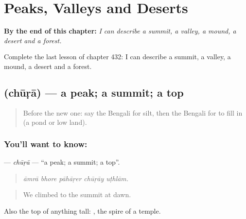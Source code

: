 
\chapter{Peaks, Valleys and Deserts}
\label{ch:bn-peaks-valleys-and-deserts}

\begin{chapteropening}
\textbf{By the end of this chapter:} \emph{I can describe a summit, a valley, a mound, a desert and a forest.}

Complete the last lesson of chapter 432: I can describe a summit, a valley, a mound, a desert and a forest.
\end{chapteropening}

\section[\texorpdfstring{\bn{চূড়া} (chūṛā)}{চূড়া (chūṛā)}]{ (chūṛā) — a peak; a summit; a top}

\label{lesson:BN-C432-chura}



\begin{quote}
Before the new one: say the Bengali for silt, then the Bengali for to fill in (a pond or low land).
\end{quote}

\subsection*{You'll want to know: }
\textbf{} — \emph{chūṛā} — \textquotedblleft{}a peak; a summit; a top\textquotedblright{}.

\begin{quote}
    
\end{quote}

\begin{quote}
\emph{āmrā bhore pāhāṛer chūṛāy uṭhlām.}
\end{quote}

\begin{quote}
We climbed to the summit at dawn.
\end{quote}

Also the top of anything tall:  , the spire of a temple.


